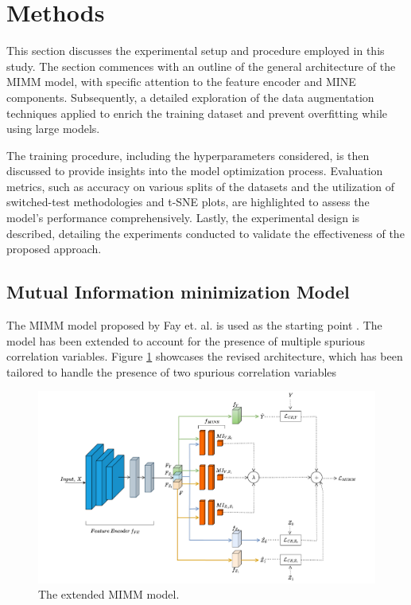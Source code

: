 \documentclass[12pt,DIV14,BCOR12mm,a4paper,footinclude=false,headinclude,parskip=half-,twoside,openright,cleardoublepage=empty,toc=index,bibliography=totoc,listof=totoc]{scrreprt}
\numberwithin{equation}{chapter}
\begin{document}
\section{Methods}
This section discusses the experimental setup and procedure employed in this study. The section commences with an outline of the general architecture of the MIMM model, with specific attention to the feature encoder and MINE components. Subsequently, a detailed exploration of the data augmentation techniques applied to enrich the training dataset and prevent overfitting while using large models. 

The training procedure, including the hyperparameters considered, is then discussed to provide insights into the model optimization process. Evaluation metrics, such as accuracy on various splits of the datasets and the utilization of switched-test methodologies and t-SNE plots, are highlighted to assess the model's performance comprehensively. Lastly, the experimental design is described, detailing the experiments conducted to validate the effectiveness of the proposed approach.

\subsection{Mutual Information minimization Model}
The MIMM model proposed by Fay et. al. is used as the starting point \cite{10162210}. The model has been extended to account for the presence of multiple spurious correlation variables. Figure \ref{fig:MIMM_model_multiple} showcases the revised architecture, which has been tailored to handle the presence of two spurious correlation variables

\begin{figure}[H]
\hspace{-1.5cm}
\includegraphics[width=1.2\linewidth]{thesis/figures/MIMM_multiple.pdf}
\caption{The extended MIMM model.}
\label{fig:MIMM_model_multiple}
\end{figure}
\end{document}
